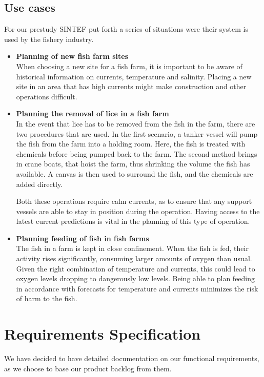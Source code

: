 \documentclass[11pt,a4paper,titlepage,oneside]{report}
\begin{document}
  \subsection{Use cases}
	For our prestudy SINTEF put forth a series of situations were their system is used by the fishery industry. 
	\begin{itemize}
		\item \textbf{Planning of new fish farm sites} \\
		When choosing a new site for a fish farm, it is important to be aware of historical information on currents, temperature and salinity. Placing a new site in an area that has high currents might make construction and other operations difficult.
		\item \textbf{Planning the removal of lice in a fish farm} \\
		In the event that lice has to be removed from the fish in the farm, there are two procedures that are used. In the first scenario, a tanker vessel will pump the fish from the farm into a holding room. Here, the fish is treated with chemicals before being pumped back to the farm. The second method brings in crane boats, that hoist the farm, thus shrinking the volume the fish has available. A canvas is then used to surround the fish, and the chemicals are added directly. 

		Both these operations require calm currents, as to ensure that any support vessels are able to stay in position during the operation. Having access to the latest current predictions is vital in the planning of this type of operation.
		\item \textbf{Planning feeding of fish in fish farms} \\
		The fish in a farm is kept in close confinement. When the fish is fed, their activity rises significantly, consuming larger amounts of oxygen than usual. Given the right combination of temperature and currents, this could lead to oxygen levels dropping to dangerously low levels. Being able to plan feeding in accordance with forecasts for temperature and currents minimizes the risk of harm to the fish.
	\end{itemize}

\section{Requirements Specification}
We have decided to have detailed documentation on our functional requirements, as we choose to base our product backlog from them.
\end{document}
